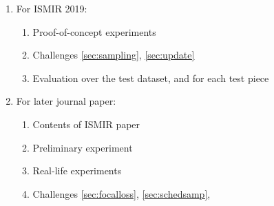 \documentclass{article}
\begin{document}
\begin{enumerate}
\item For ISMIR 2019: 
	\begin{enumerate}
	\item Proof-of-concept experiments
	\item Challenges \ref{sec:sampling}, \ref{sec:update}
	\item Evaluation over the test dataset, and for each test piece
	\end{enumerate}

\item For later journal paper:
	\begin{enumerate}
	\item Contents of ISMIR paper
	\item Preliminary experiment
	\item Real-life experiments
	\item Challenges \ref{sec:focalloss}, \ref{sec:schedsamp},
	\end{enumerate}
\end{enumerate}



\end{document}
